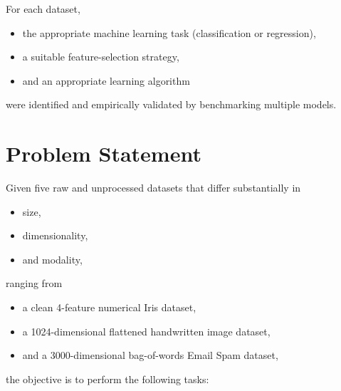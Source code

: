 \documentclass[12pt,a4paper]{article}
\begin{document}
For each dataset,

\begin{itemize}
    \item the appropriate machine learning task
          (classification or regression),
    \item a suitable feature-selection strategy,
    \item and an appropriate learning algorithm
\end{itemize}

were identified and empirically validated by benchmarking multiple models.

\section{Problem Statement}

Given five raw and unprocessed datasets that differ substantially in

\begin{itemize}
    \item size,
    \item dimensionality,
    \item and modality,
\end{itemize}

ranging from

\begin{itemize}
    \item a clean 4-feature numerical Iris dataset,
    \item a 1024-dimensional flattened handwritten image dataset,
    \item and a 3000-dimensional bag-of-words Email Spam dataset,
\end{itemize}

the objective is to perform the following tasks:
\end{document}
